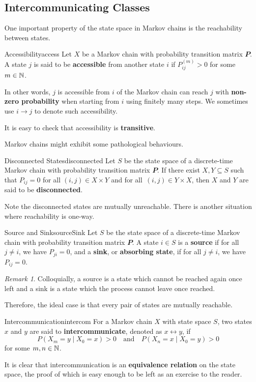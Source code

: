 \documentclass[math, code]{amznotes}
\theoremstyle{remark}
\newtheorem*{remark}{Remark}
\begin{document}
\subsection{Intercommunicating Classes}
One important property of the state space in Markov chains is the reachability between states.
\begin{dfnbox}{Accessibility}{access}
    Let $X$ be a Markov chain with probability transition matrix $\mathbfit{P}$. A state $j$ is said to be {\color{red} \textbf{accessible}} from another state $i$ if $P^{\left(m\right)}_{ij} > 0$ for some $m \in \mathbb{N}$.
\end{dfnbox}
In other words, $j$ is accessible from $i$ of the Markov chain can reach $j$ with \textbf{non-zero probability} when starting from $i$ using finitely many steps. We sometimes use $i \to j$ to denote such accessibility.

It is easy to check that accessibility is \textbf{transitive}.

Markov chains might exhibit some pathological behaviours.
\begin{dfnbox}{Disconnected States}{disconnected}
    Let $S$ be the state space of a discrete-time Markov chain with probability transition matrix $\mathbfit{P}$. If there exist $X, Y \subseteq S$ such that $P_{ij} = 0$ for all $\left(i, j\right) \in X \times Y$ and for all~$\left(i, j\right) \in Y \times X$, then $X$ and $Y$ are said to be {\color{red} \textbf{disconnected}}. 
\end{dfnbox}
Note the disconnected states are mutually unreachable. There is another situation where reachability is one-way.
\begin{dfnbox}{Source and Sink}{sourceSink}
    Let $S$ be the state space of a discrete-time Markov chain with probability transition matrix $\mathbfit{P}$. A state $i \in S$ is a {\color{red} \textbf{source}} if for all $j \neq i$, we have $P_{ji} = 0$, and a {\color{red} \textbf{sink}}, or {\color{red} \textbf{absorbing state}}, if for all $j \neq i$, we have $P_{ij} = 0$.
\end{dfnbox}
\begin{notebox}
    \begin{remark}
        Colloquially, a source is a state which cannot be reached again once left and a sink is a state which the process cannot leave once reached.
    \end{remark}
\end{notebox}
Therefore, the ideal case is that every pair of states are mutually reachable.
\begin{dfnbox}{Intercommunication}{intercom}
    For a Markov chain $X$ with state space $S$, two states $x$ and $y$ are said to {\color{red} \textbf{intercommunicate}}, denoted as $x \leftrightarrow y$, if 
    \begin{equation*}
        P\left(X_m = y \mid X_0 = x\right) > 0 \quad\textrm{and}\quad P\left(X_n = x \mid X_0 = y\right) > 0
    \end{equation*}
    for some $m, n \in \mathbb{N}$.
\end{dfnbox}
It is clear that intercommunication is an \textbf{equivalence relation} on the state space, the proof of which is easy enough to be left as an exercise to the reader. 
\end{document}
